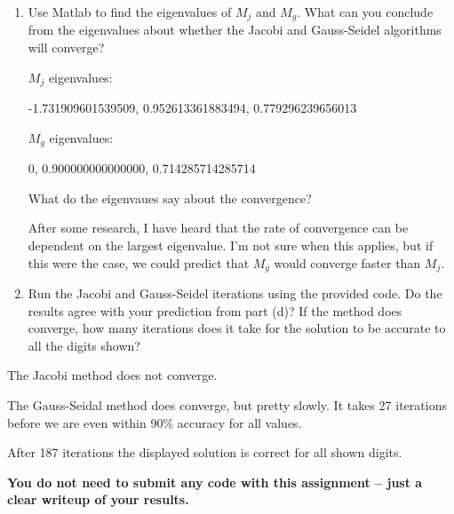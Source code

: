 \documentclass{article}
\begin{document}
\begin{enumerate}
\begin{enumerate}
\item Use Matlab to find the eigenvalues of $M_j$ and $M_g$. What can you conclude from the eigenvalues about whether the Jacobi and Gauss-Seidel algorithms will converge? \newline

\begin{mdframed}[style=MyFrame]

$M_j$ eigenvalues:

  -1.731909601539509,
   0.952613361883494,
   0.779296239656013

$M_g$ eigenvalues:

                   0,
   0.900000000000000,
   0.714285714285714

What do the eigenvaues say about the convergence?

After some research, I have heard that the rate of convergence can be dependent on the largest eigenvalue. I'm not sure when this applies, but if this were the case, we could predict that $M_g$ would converge faster than $M_j$.

\end{mdframed}

\item Run the Jacobi and Gauss-Seidel iterations using the provided code. Do the results agree with your prediction from part (d)? If the method does converge, how many iterations does it take for the solution to be accurate to all the digits shown? \newline
\end{enumerate}

\begin{mdframed}[style=MyFrame]
The Jacobi method does not converge.

The Gauss-Seidal method does converge, but pretty slowly. It takes 27 iterations before we are even within 90\% accuracy for all values.

After 187 iterations the displayed solution is correct for all shown digits.

\end{mdframed}

{\bf You do not need to submit any code with this assignment -- just a clear writeup of your results.}
\end{enumerate}
\end{document}

